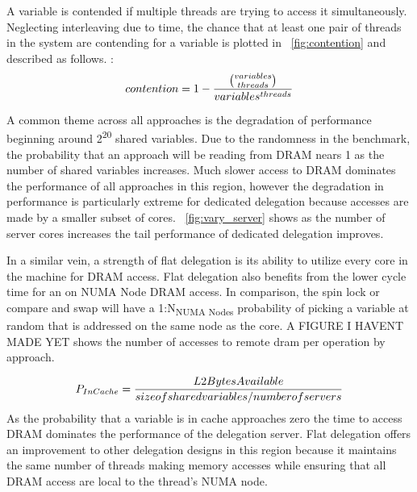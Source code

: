 \documentclass{uicthesi}
\begin{document}
A variable is contended if multiple threads are trying to access it simultaneously. Neglecting interleaving due to time, the chance that at least one pair of threads in the system are contending for a variable is plotted in ~\ref{fig:contention} and described as follows. : 
\begin{displaymath}
contention = 1 - {{ variables \choose threads }  \over  variables^{threads}}
\end{displaymath}

A common theme across all approaches is the degradation of performance beginning around 2\textsuperscript{20} shared variables. Due to the randomness in the benchmark, the probability that an approach will be reading from DRAM nears 1 as the number of shared variables increases. Much slower access to DRAM dominates the performance of all approaches in this region, however the degradation in performance is particularly extreme for dedicated delegation because accesses are made by a smaller subset of cores. ~\ref{fig:vary_server} shows as the number of server cores increases the tail performance of dedicated delegation improves. 


In a similar vein, a strength of flat delegation is its ability to utilize every core in the machine for DRAM access. Flat delegation also benefits from the lower cycle time for an on NUMA Node DRAM access. In comparison, the spin lock or compare and swap will have a 1:N\textsubscript{NUMA Nodes} probability of picking a variable at random that is addressed on the same node as the core. A FIGURE I HAVENT MADE YET shows the number of accesses to remote dram per operation by approach. 

\begin{displaymath}
{P_{In Cache}} = {{L2BytesAvailable} \over { size of shared variables / number of servers}}
\end{displaymath}
As the probability that a variable is in cache approaches zero the time to access DRAM dominates the performance of the delegation server. Flat delegation offers an improvement to other delegation designs in this region because it maintains the same number of threads making memory accesses while ensuring that all DRAM access are local to the thread's NUMA node. 
\end{document}
